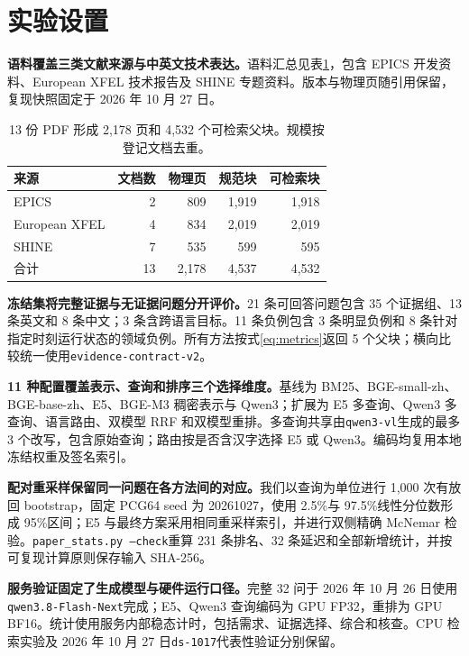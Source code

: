 \section{实验设置}

\textbf{语料覆盖三类文献来源与中英文技术表达。}语料汇总见表\ref{tab:corpus}，包含 EPICS 开发资料、European XFEL 技术报告及 SHINE 专题资料。版本与物理页随引用保留，复现快照固定于 2026 年 10 月 27 日。
\begin{table}[!htbp]\centering\small
\caption{13 份 PDF 形成 2,178 页和 4,532 个可检索父块。规模按登记文档去重。}\label{tab:corpus}
\begin{tabular}{lrrrr}\toprule 来源 & 文档数 & 物理页 & 规范块 & 可检索块\\\midrule
EPICS &2&809&1,919&1,918\\
European XFEL &4&834&2,019&2,019\\
SHINE &7&535&599&595\\\midrule
合计 &13&2,178&4,537&4,532\\\bottomrule\end{tabular}
\end{table}

\textbf{冻结集将完整证据与无证据问题分开评价。}21 条可回答问题包含 35 个证据组、13 条英文和 8 条中文；3 条含跨语言目标。11 条负例包含 3 条明显负例和 8 条针对指定时刻运行状态的领域负例。所有方法按式\eqref{eq:metrics}返回 5 个父块；横向比较统一使用\texttt{evidence-contract-v2}。

\textbf{11 种配置覆盖表示、查询和排序三个选择维度。}基线为 BM25、BGE-small-zh、BGE-base-zh、E5、BGE-M3 稠密表示与 Qwen3；扩展为 E5 多查询、Qwen3 多查询、语言路由、双模型 RRF 和双模型重排。多查询共享由\texttt{qwen3-vl}生成的最多 3 个改写，包含原始查询；路由按是否含汉字选择 E5 或 Qwen3。编码均复用本地冻结权重及签名索引。

\textbf{配对重采样保留同一问题在各方法间的对应。}我们以查询为单位进行 1,000 次有放回 bootstrap，固定 PCG64 seed 为 20261027，使用 2.5\%与 97.5\%线性分位数形成 95\%区间\citep{efron}；E5 与最终方案采用相同重采样索引，并进行双侧精确 McNemar 检验\citep{mcnemar,smucker,sakai}。\texttt{paper\_stats.py --check}重算 231 条排名、32 条延迟和全部新增统计，并按可复现计算原则保存输入 SHA-256\citep{sandve}。

\textbf{服务验证固定了生成模型与硬件运行口径。}完整 32 问于 2026 年 10 月 26 日使用\texttt{qwen3.8-Flash-Next}完成；E5、Qwen3 查询编码为 GPU FP32，重排为 GPU BF16。统计使用服务内部稳态计时，包括需求、证据选择、综合和核查。CPU 检索实验及 2026 年 10 月 27 日\texttt{ds-1017}代表性验证分别保留。
